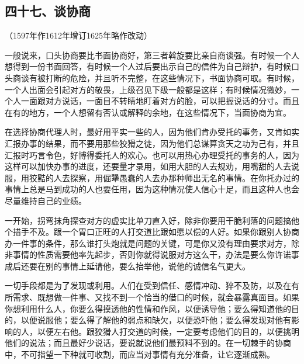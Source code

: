 \subsection*{四十七、谈协商}
\begin{center}
    （1597年作1612年增订1625年略作改动）
\end{center}
\par 一般说来，口头协商要比书面协商好，第三者斡旋要比亲自商谈强。有时候一个人想得到一份书面回答，有时候一个人过后要出示自己的信件为自己辩护，有时候口头商谈有被打断的危险，并且听不完整，在这些情况下，书面协商可取。有时候，一个人出面会引起对方的敬畏，上级召见下级一般都是这样；有时候情况微妙，一个人一面跟对方说话，一面目不转睛地盯着对方的脸，可以把握说话的分寸。而且在有的地方，一个人想留有否认或解释的余地，在这些情况下，当面协商为宜。
\par 在选择协商代理人时，最好用平实一些的人，因为他们肯办受托的事务，又肯如实汇报办事的结果，而不要用那些狡猾之徒，因为他们总谋算贪天之功为己有，并且汇报时巧言令色，好博得委托人的欢心。也可以用热心办理受托的事务的人，因为这样可以加快办事的进度，还要量才录用，如用大胆的人去规劝，用嘴甜的人去说服，用狡黠的人去探察，用倔犟愚蠢的人去办那种师出无名的事情。在你托办过的事情上总是马到成功的人也要任用，因为这种情况使人信心十足，而且这种人也会尽量维持自己的业绩。
\par 一开始，拐弯抹角探查对方的虚实比单刀直入好，除非你要用干脆利落的问题搞他个措手不及。跟一个胃口正旺的人打交道比跟如愿以偿的人好。如果你跟别人协商办一件事的条件，那么谁打头炮就是问题的关键，可是你又没有理由要求对方，除非事情的性质需要他率先起步，否则你就得说服对方这么干，办法是要么你许诺事成后还要在别的事情上延请他，要么抬举他，说他的诚信名气更大。
\par 一切手段都是为了发现或利用。人们在受到信任、感情冲动、猝不及防，以及在有所需求、既想做一件事、又找不到一个恰当的借口的时候，就会暴露真面目。如果你想利用什么人，你要么得摸透他的性情和作风，以便诱导他；要么得知道他的目的，以便说服他；要么得了解他的弱点和缺欠，以便恐吓他；要么得发现对他有影响的人，以便左右他。跟狡猾人打交道的时候，一定要考虑他们的目的，以便挑明他们的说法；而且最好少说话，要说就说他们最预料不到的。在一切棘手的协商中，不可指望一下种就可收割，而应当对事情有充分准备，让它逐渐成熟。




